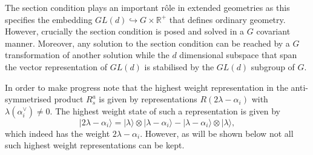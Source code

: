 The section condition plays an important rôle in extended geometries as this specifies the embedding $GL(d)\hookrightarrow G\times\mathbb{R}^+$ that defines ordinary geometry. However, crucially the section condition is posed and solved in a $G$ covariant manner. Moreover, any solution to the section condition can be reached by a $G$ transformation of another solution while the $d$ dimensional subspace that span the vector representation of $GL(d)$ is stabilised by the $GL(d)$ subgroup of $G$.

In order to make progress note that the highest weight representation in the anti-symmetrised product $R_s^a$ is given by representations $R(2\lambda-\alpha_i)$ with $\lambda(\alpha^\vee_i)\neq 0$. The highest weight state of such a representation is given by
\begin{equation}
    |2\lambda-\alpha_i\rangle = |\lambda\rangle \otimes |\lambda-\alpha_i\rangle - |\lambda-\alpha_i\rangle \otimes |\lambda\rangle,
\end{equation}
which indeed has the weight $2\lambda-\alpha_i$. However, as will be shown below not all such highest weight representations can be kept.

